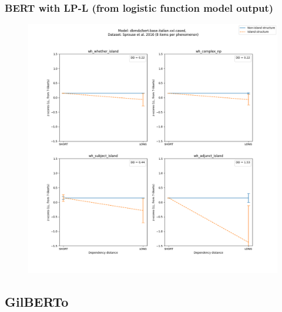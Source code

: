 \subsubsection{BERT with LP-L (from logistic function model output)}
\begin{figure}[h]
	\centering
	\includegraphics[width=1\textwidth]{images/Chapter1/Sprouse_wh_dbmdz_bert-base-italian-xxl-cased_LL-zscores-likert-2022-07-11.png} 
\end{figure}

\clearpage
\subsection{GilBERTo}

